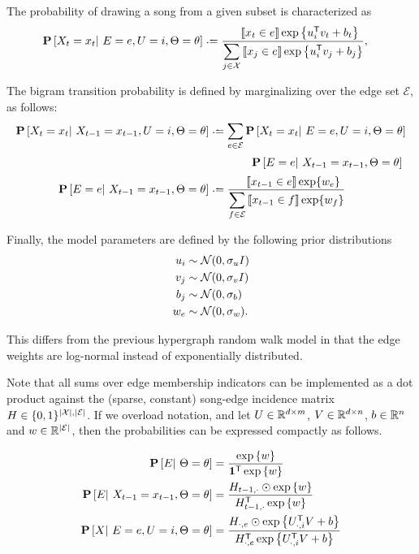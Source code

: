 \documentclass{article}
\begin{document}
The probability of drawing a song from a given subset is characterized as
\begin{align*}
\P\left[X_t=x_t \given E=e, U=i, \Theta=\theta \right] &\defeq 
\frac{\phantom\sum\ind{x_t \in e}\exp\left\{u_i\trans v_t + b_t\right\}}{\displaystyle\sum_{j \in \X}\ind{x_j \in e} \exp\left\{u_i\trans v_j + b_j\right\}},
\end{align*}

The bigram transition probability is defined by marginalizing over the edge set $\mathcal{E}$, as follows:
\begin{align*}
\P\left[X_{t}= x_t \given X_{t-1}=x_{t-1}, U=i, \Theta=\theta \right] &\defeq \sum_{e \in \mathcal{E}} 
\P\left[X_{t}=x_t \given E=e, U=i, \Theta=\theta\right]\\
&\phantom{\defeq \sum}\quad\P\left[E=e \given X_{t-1} = x_{t-1}, \Theta=\theta\right]\\
\P\left[E=e \given X_{t-1}=x_{t-1}, \Theta=\theta\right] &\defeq \frac{\phantom\sum\ind{x_{t-1}\in e}\exp\{w_e\}}{ \displaystyle\sum_{f \in \mathcal{E}} \ind{x_{t-1} \in f} \exp\{w_f\} }
\end{align*}

Finally, the model parameters are defined by the following prior distributions
\begin{align*}
u_i &\sim \mathcal{N}(0, \sigma_u I)\\
v_j &\sim \mathcal{N}(0, \sigma_v I)\\
b_j &\sim \mathcal{N}(0, \sigma_b)\\
w_e &\sim \mathcal{N}(0, \sigma_w).\\
\end{align*}

This differs from the previous hypergraph random walk model in that the edge weights are log-normal instead of
exponentially distributed.  

Note that all sums over edge membership indicators can be implemented as a dot product against the (sparse, constant) 
song-edge incidence matrix $H \in \{0,1\}^{|\mathcal{X}|, |\mathcal{E}|}$.  If we overload notation, and let $U \in \mathbb{R}^{d\times m}$, $V \in \mathbb{R}^{d \times n}$, $b \in \mathbb{R}^{n}$ and $w \in
\mathbb{R}^{|\mathcal{E}|}$, then the probabilities can be expressed compactly as follows.

\begin{align*}
\mathbf{P}\left[E |~ \Theta=\theta\right] &= \frac{\exp\left\{w\right\}}{\mathbf{1}^\mathsf{T} \exp\left\{w\right\}}\\
\mathbf{P}\left[E |~ X_{t-1}=x_{t-1}, \Theta=\theta\right] &= \frac{ H_{t-1, \cdot} \odot \exp\left\{w\right\} }{H_{t-1, \cdot}^\mathsf{T} \exp\left\{w\right\}}\\
\mathbf{P}\left[X |~ E=e, U=i, \Theta=\theta\right] &= \frac{ H_{\cdot, e} \odot \exp\left\{U_{\cdot,i}^\mathsf{T} V + b\right\} }{ H_{\cdot, e}^\mathsf{T} \exp\left\{U_{\cdot,i}^\mathsf{T} V + b\right\}}
\end{align*}
\end{document}

